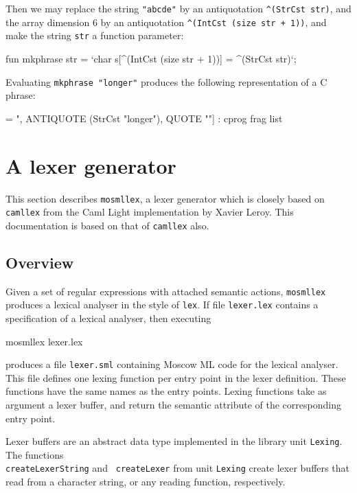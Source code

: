 \documentclass[fleqn]{article}
\begin{document}
\noindent Then we may replace the string {\tt "abcde"} by an
antiquotation {\tt \verb#^#(StrCst str)}, and the array dimension 6 by
an antiquotation {\tt \verb#^#(IntCst (size str + 1))}, and make the
string {\tt str} a function parameter:

\begin{program}
fun mkphrase str = `char s[^(IntCst (size str + 1))] = ^(StrCst str)`;
\end{program}

\noindent Evaluating {\tt mkphrase "longer"} produces the following
representation of a C phrase:

\begin{program}
[QUOTE "char s[", ANTIQUOTE (IntCst 7), QUOTE "] = ", 
 ANTIQUOTE (StrCst "longer"), QUOTE ""] : cprog frag list
\end{program}


\newpage

\section{A lexer generator}
\label{sec-mosmllex}

This section describes {\tt mosmllex}, a lexer generator which is
closely based on {\tt camllex} from the Caml Light implementation by
Xavier Leroy.  This documentation is based on that of {\tt camllex}
also.  


\subsection{Overview}

Given a set of regular expressions with attached semantic actions,
{\tt mosmllex} produces a lexical analyser in the style of {\tt lex}.
If file {\tt lexer.lex} contains a specification of a lexical
analyser, then executing

\begin{program}
mosmllex lexer.lex  
\end{program}

\noindent produces a file {\tt lexer.sml} containing Moscow ML code
for the lexical analyser.  This file defines one lexing function per
entry point in the lexer definition.  These functions have the same
names as the entry points.  Lexing functions take as argument a lexer
buffer, and return the semantic attribute of the corresponding entry
point.

Lexer buffers are an abstract data type implemented in the library
unit {\tt Lexing}.  The functions\\ {\tt createLexerString} and {\tt
  createLexer} from unit {\tt Lexing} create lexer buffers that read
from a character string, or any reading function, respectively.
\end{document}
